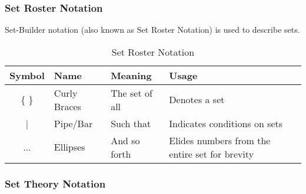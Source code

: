 \documentclass[11pt]{article}
\begin{document}
\subsubsection{Set Roster Notation}

Set-Builder notation (also known as Set Roster Notation) is used to describe sets.

\begin{table}[!htbp]
    \centering
    \caption{Set Roster Notation}
    \begin{tabular}{ c l l l }
        \toprule
        Symbol  & Name          & Meaning           & Usage \\
        \midrule
        \{ \}   & Curly Braces  & The set of all    & Denotes a set \\
        |       & Pipe/Bar      & Such that         & Indicates conditions on sets \\
        ...     & Ellipses      & And so forth      & Elides numbers from the entire set for brevity \\
        \bottomrule
    \end{tabular}
    \label{tab:tbl-set-notation}
\end{table}

\subsubsection{Set Theory Notation}
\end{document}
